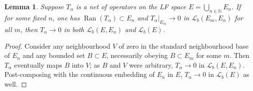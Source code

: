 \documentclass[11pt]{article}
\numberwithin{equation}{section}
\numberwithin{equation}{section}
\newtheorem{Lemma}[Theorem]{Lemma}
\newcommand{\NN}{{\mathbb N}}
\newcommand{\LL}{{\mathcal L}}
\newcommand{\Ran}{\operatorname{Ran}}
\begin{document}
 \begin{Lemma}\label{lem:LbLF}
 	Suppose $T_\alpha$ is a net of operators on the LF space $E=\bigcup_{n\in\NN} E_n$. If for some fixed $n$, one has $\Ran(T_\alpha)\subset E_n$ and $T_\alpha|_{E_m}\to 0$ in $\LL_b(E_m,E_n)$ for all $m$, then $T_\alpha\to 0$ in both $\LL_b(E,E_n)$ and $\LL_b(E)$.
 \end{Lemma}
 \begin{proof}
 	Consider any neighbourhood $V$ of zero in the standard neighbourhood base of $E_n$ and any bounded set $B\subset E$, necessarily obeying $B\subset E_m$ for some $m$. Then $T_\alpha$ eventually maps $B$ into $V$; as $B$ and $V$ were arbitrary, $T_\alpha\to 0$ in $\LL_b(E,E_n)$. Post-composing with the continuous embedding of $E_n$ in $E$, $T_\alpha\to 0$ in $\LL_b(E)$ as well.
 \end{proof}
\end{document}
